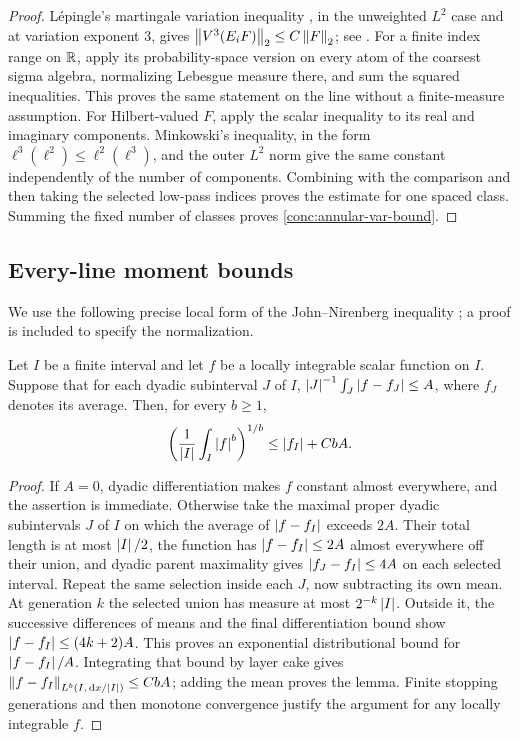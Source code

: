 \begin{proof}
L\'epingle's martingale variation inequality \cite{Lepingle1976}, in
the unweighted $L^2$ case and at variation exponent $3$, gives
$\left\|V^3(E_iF)\right\|_2\leq C\left\|F\right\|_2$; see
\cite[Theorem~1.1, with $p=2$, $r=3$, and weight one]{ZorinKranich2020}.
For a finite index range on $\mathbb R$, apply its probability-space version
on every atom of the coarsest sigma algebra, normalizing Lebesgue
measure there, and sum the squared inequalities.  This proves the
same statement on the line without a finite-measure assumption.
For Hilbert-valued $F$, apply the scalar inequality to its real and
imaginary components.  Minkowski's inequality, in the form
$\ell^3(\ell^2)\leq\ell^2(\ell^3)$, and the outer $L^2$ norm give
the same constant independently of the number of components.
Combining with the comparison and then taking the selected low-pass
indices proves the estimate for one spaced class.  Summing the fixed
number of classes proves \eqref{conc:annular-var-bound}.
\end{proof}

\subsection{Every-line moment bounds}

We use the following precise local form of the John--Nirenberg
inequality \cite{JohnNirenberg1961}; a proof is included to specify
the normalization.

\begin{lemma}\label{conc:john-nirenberg}
Let $I$ be a finite interval and let $f$ be a locally integrable scalar
function on $I$.  Suppose that for each dyadic subinterval $J$ of $I$,
$\left|J\right|^{-1}\int_J\left|f-f_J\right|\leq A$, where $f_J$ denotes its average.
Then, for every $b\geq1$,
\[
 \left(\frac1{\left|I\right|}\int_I\left|f\right|^b\right)^{1/b}
 \leq\left|f_I\right|+CbA.
\]
\end{lemma}

\begin{proof}
If $A=0$, dyadic differentiation makes $f$ constant almost everywhere,
and the assertion is immediate.  Otherwise take the maximal proper
dyadic subintervals $J$ of $I$ on which the average of
$\left|f-f_I\right|$ exceeds $2A$.  Their total length is at most
$\left|I\right|/2$, the function has $\left|f-f_I\right|\leq2A$ almost everywhere
off their union, and dyadic parent maximality gives
$\left|f_J-f_I\right|\leq4A$ on each selected interval.  Repeat the same
selection inside each $J$, now subtracting its own mean.  At generation
$k$ the selected union has measure at most $2^{-k}\left|I\right|$.
Outside it, the successive differences of means and the final
differentiation bound show
$\left|f-f_I\right|\leq(4k+2)A$.
This proves an exponential distributional bound for $\left|f-f_I\right|/A$.
Integrating that bound by layer cake gives
$\left\|f-f_I\right\|_{L^b(I,\,\mathrm d x/\left|I\right|)}\leq CbA$; adding the mean proves
the lemma.  Finite stopping generations and then monotone convergence
justify the argument for any locally integrable $f$.
\end{proof}

